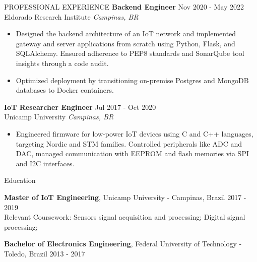 \documentclass{resume} %
\begin{document}
\begin{rSection}{PROFESSIONAL EXPERIENCE}
\textbf{Backend Engineer} \hfill Nov 2020 - May 2022\\
Eldorado Research Institute \hfill \textit{Campinas, BR}
 \begin{itemize}
    \itemsep -3pt {} 
     \item Designed the backend architecture of an IoT network and implemented gateway and server applications from scratch using Python, Flask, and SQLAlchemy. Ensured adherence to PEP8 standards and SonarQube tool insights through a code audit.
     \item Optimized deployment by transitioning on-premise Postgres and MongoDB databases to Docker containers.
 \end{itemize}

\textbf{IoT Researcher Engineer} \hfill Jul 2017 - Oct 2020\\
Unicamp University \hfill \textit{Campinas, BR}
 \begin{itemize}
    \itemsep -3pt {} 
     \item Engineered firmware for low-power IoT devices using C and C++ languages, targeting Nordic and STM families. Controlled peripherals like ADC and DAC, managed communication with EEPROM and flash memories via SPI and I2C interfaces.
 \end{itemize}

\end{rSection} 


\begin{rSection}{Education}

    {\bf Master of IoT Engineering}, Unicamp University - Campinas, Brazil \hfill {2017 - 2019}\\
    Relevant Coursework: Sensors signal acquisition and processing; Digital signal processing;
    
    {\bf Bachelor of Electronics Engineering}, Federal University of Technology - Toledo, Brazil  \hfill {2013 - 2017}
    
    
    \end{rSection}
    
\end{document}
